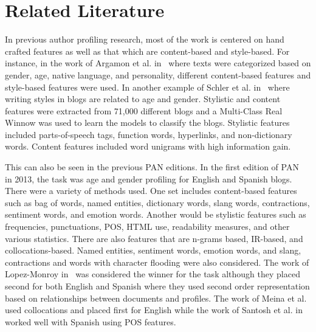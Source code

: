 \documentclass[conference]{IEEEtran}
\begin{document}

\section{Related Literature}
In previous author profiling research, most of the work is centered on hand crafted features as well as that which are content-based and style-based. For instance, in the work of Argamon et al. in~\cite{argamon2009automatically} where texts were categorized based on gender, age, native language, and personality, different content-based features and style-based features were used. In another example of Schler et al. in~\cite{schler2006effects} where writing styles in blogs are related to age and gender. Stylistic and content features were extracted from 71,000 different blogs and a Multi-Class Real Winnow was used to learn the models to classify the blogs. Stylistic features included parts-of-speech tags, function words, hyperlinks, and non-dictionary words. Content features included word unigrams with high information gain. %

This can also be seen in the previous PAN editions. In the first edition of PAN~\cite{rangel2013overview} in 2013, the task  was age and gender profiling for English and Spanish blogs. There were a variety of methods used. One set includes content-based features such as bag of words, named entities, dictionary words, slang words, contractions, sentiment words, and emotion words. Another would be stylistic features such as frequencies, punctuations, POS, HTML use, readability measures, and other various statistics. There are also features that are n-grams based, IR-based, and collocations-based. Named entities, sentiment words, emotion words, and slang, contractions and words with character flooding were also considered. The work of Lopez-Monroy in~\cite{lopez2013inaoe} was considered the winner for the task although they placed second for both English and Spanish where they used second order representation based on relationships between documents and profiles. The work of Meina et al.~\cite{meina2013ensemble} used collocations and placed first for English while the work of Santosh et al. in~\cite{santosh2013author} worked well with Spanish using POS features.
\end{document}
